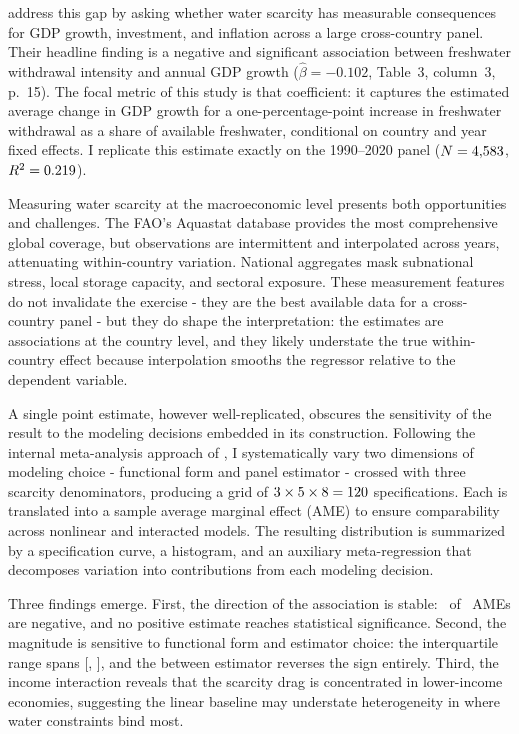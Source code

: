 \documentclass[12pt]{article}
\begin{document}
\citet{frost_madeira_mj_2025} address this gap by asking whether water scarcity has measurable consequences for GDP growth, investment, and inflation across a large cross-country panel. Their headline finding is a negative and significant association between freshwater withdrawal intensity and annual GDP growth ($\hat{\beta} = -0.102$, Table~3, column~3, p.~15). The focal metric of this study is that coefficient: it captures the estimated average change in GDP growth for a one-percentage-point increase in freshwater withdrawal as a share of available freshwater, conditional on country and year fixed effects. I replicate this estimate exactly on the 1990--2020 panel ($N = 4{,}583$, $R^2 = 0.219$).

Measuring water scarcity at the macroeconomic level presents both opportunities and challenges. The FAO's Aquastat database provides the most comprehensive global coverage, but observations are intermittent and interpolated across years, attenuating within-country variation. National aggregates mask subnational stress, local storage capacity, and sectoral exposure. These measurement features do not invalidate the exercise - they are the best available data for a cross-country panel - but they do shape the interpretation: the estimates are associations at the country level, and they likely understate the true within-country effect because interpolation smooths the regressor relative to the dependent variable.

A single point estimate, however well-replicated, obscures the sensitivity of the result to the modeling decisions embedded in its construction. Following the internal meta-analysis approach of \citet{banzhaf_smith_2007}, I systematically vary two dimensions of modeling choice - functional form and panel estimator - crossed with three scarcity denominators, producing a grid of $3 \times 5 \times 8 = 120$ specifications. Each is translated into a sample average marginal effect (AME) to ensure comparability across nonlinear and interacted models. The resulting distribution is summarized by a specification curve, a histogram, and an auxiliary meta-regression that decomposes variation into contributions from each modeling decision.

Three findings emerge. First, the direction of the association is stable: \NegativeCount\ of \TotalSpecs\ AMEs are negative, and no positive estimate reaches statistical significance. Second, the magnitude is sensitive to functional form and estimator choice: the interquartile range spans [\PTwentyFiveAME, \PSeventyFiveAME], and the between estimator reverses the sign entirely. Third, the income interaction reveals that the scarcity drag is concentrated in lower-income economies, suggesting the linear baseline may understate heterogeneity in where water constraints bind most.
\end{document}
